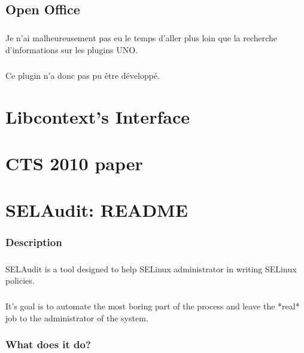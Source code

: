 	\section{Open Office}
		\paragraph*{}
			Je n'ai malheureusement pas eu le temps d'aller plus loin que la recherche d'informations sur les plugins UNO.
			
		\paragraph*{}
			Ce plugin n'a donc pas pu être développé.
	
\chapter{Libcontext's Interface}
	\label{PIGA_SYSTRANS Libcontext Interface}
	

\chapter{CTS 2010 paper}
	\label{PIGA_SYSTRANS paper}
	

\chapter{SELAudit: README}
	\label{SELAudit}

\subsection*{Description}
\paragraph*{}
SELAudit is a tool designed to help SELinux administrator in writing SELinux policies.

\paragraph*{}
It's goal is to automate the most boring part of the process and leave the *real* job to
the administrator of the system.

\subsection*{What does it do?}
